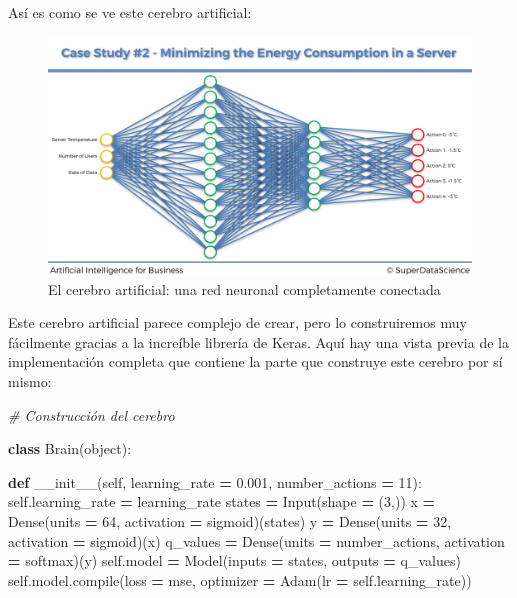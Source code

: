 \documentclass[
]{book}
\newenvironment{Shaded}{\begin{snugshade}}{\end{snugshade}}
\newcommand{\BuiltInTok}[1]{#1}
\newcommand{\CommentTok}[1]{\textcolor[rgb]{0.56,0.35,0.01}{\textit{#1}}}
\newcommand{\DecValTok}[1]{\textcolor[rgb]{0.00,0.00,0.81}{#1}}
\newcommand{\FloatTok}[1]{\textcolor[rgb]{0.00,0.00,0.81}{#1}}
\newcommand{\FunctionTok}[1]{\textcolor[rgb]{0.00,0.00,0.00}{#1}}
\newcommand{\KeywordTok}[1]{\textcolor[rgb]{0.13,0.29,0.53}{\textbf{#1}}}
\newcommand{\NormalTok}[1]{#1}
\newcommand{\OperatorTok}[1]{\textcolor[rgb]{0.81,0.36,0.00}{\textbf{#1}}}
\newcommand{\StringTok}[1]{\textcolor[rgb]{0.31,0.60,0.02}{#1}}
\newcommand{\VariableTok}[1]{\textcolor[rgb]{0.00,0.00,0.00}{#1}}
\begin{document}
Así es como se ve este cerebro artificial:

\begin{figure}
\centering
\includegraphics{Images/Brain.png}
\caption{El cerebro artificial: una red neuronal completamente conectada}
\end{figure}

Este cerebro artificial parece complejo de crear, pero lo construiremos muy fácilmente gracias a la increíble librería de Keras. Aquí hay una vista previa de la implementación completa que contiene la parte que construye este cerebro por sí mismo:\\

\begin{Shaded}
\begin{Highlighting}[]
\CommentTok{\# Construcción del cerebro}

\KeywordTok{class}\NormalTok{ Brain(}\BuiltInTok{object}\NormalTok{):}

    \KeywordTok{def} \FunctionTok{\_\_init\_\_}\NormalTok{(}\VariableTok{self}\NormalTok{, learning\_rate }\OperatorTok{=} \FloatTok{0.001}\NormalTok{, number\_actions }\OperatorTok{=} \DecValTok{11}\NormalTok{):}
        \VariableTok{self}\NormalTok{.learning\_rate }\OperatorTok{=}\NormalTok{ learning\_rate}
\NormalTok{        states }\OperatorTok{=}\NormalTok{ Input(shape }\OperatorTok{=}\NormalTok{ (}\DecValTok{3}\NormalTok{,))}
\NormalTok{        x }\OperatorTok{=}\NormalTok{ Dense(units }\OperatorTok{=} \DecValTok{64}\NormalTok{, activation }\OperatorTok{=} \StringTok{\textquotesingle{}sigmoid\textquotesingle{}}\NormalTok{)(states)}
\NormalTok{        y }\OperatorTok{=}\NormalTok{ Dense(units }\OperatorTok{=} \DecValTok{32}\NormalTok{, activation }\OperatorTok{=} \StringTok{\textquotesingle{}sigmoid\textquotesingle{}}\NormalTok{)(x)}
\NormalTok{        q\_values }\OperatorTok{=}\NormalTok{ Dense(units }\OperatorTok{=}\NormalTok{ number\_actions, activation }\OperatorTok{=} \StringTok{\textquotesingle{}softmax\textquotesingle{}}\NormalTok{)(y)}
        \VariableTok{self}\NormalTok{.model }\OperatorTok{=}\NormalTok{ Model(inputs }\OperatorTok{=}\NormalTok{ states, outputs }\OperatorTok{=}\NormalTok{ q\_values)}
        \VariableTok{self}\NormalTok{.model.}\BuiltInTok{compile}\NormalTok{(loss }\OperatorTok{=} \StringTok{\textquotesingle{}mse\textquotesingle{}}\NormalTok{, optimizer }\OperatorTok{=}\NormalTok{ Adam(lr }\OperatorTok{=} \VariableTok{self}\NormalTok{.learning\_rate))}
\end{Highlighting}
\end{Shaded}
\end{document}
